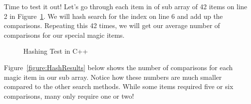\documentclass[letterpaper, 10pt,DIV=13]{scrartcl}
\numberwithin{equation}{section} %
\numberwithin{figure}{section} %
\numberwithin{table}{section} %
\begin{document}
Time to test it out! Let's go through each item in of sub array of 42 items on line 2 in Figure~\ref{figure:HashTest}. We will hash search for the index on line 6 and add up the comparisons. Repeating this 42 times, we will get our average number of comparisons for our special magic items.


\begin{figure}[h] 
    \centering 
    
    \caption{Hashing Test in C++}
    \label{figure:HashTest}
\end{figure}


\pagebreak

Figure~\ref{figure:HashResults} below shows the number of comparisons for each magic item in our sub array. Notice how these numbers are much smaller compared to the other search methods. While some items required five or six comparisons, many only require one or two! 
\end{document}

